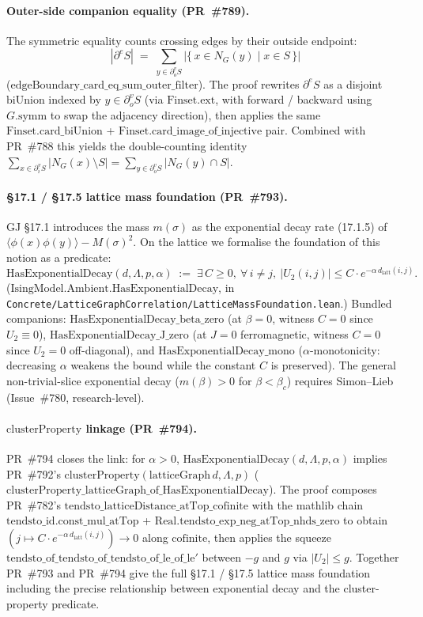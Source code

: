 \documentclass[a4paper,11pt]{article}
\begin{document}
\paragraph{Outer-side companion equality (PR~\#789).}
The symmetric equality counts crossing edges by their outside
endpoint:
\[
  |\partial^e S| \;=\;
    \sum_{y \in \partial^v_o S} \bigl|\{\,x \in N_G(y) \mid x \in S\,\}\bigr|
\]
($\mathrm{edgeBoundary\_card\_eq\_sum\_outer\_filter}$). The proof
rewrites $\partial^e S$ as a disjoint $\mathrm{biUnion}$ indexed by
$y \in \partial^v_o S$ (via $\mathrm{Finset.ext}$, with forward /
backward using $G.\mathrm{symm}$ to swap the adjacency direction),
then applies the same $\mathrm{Finset.card\_biUnion}$ +
$\mathrm{Finset.card\_image\_of\_injective}$ pair. Combined with
PR~\#788 this yields the double-counting identity
$\sum_{x \in \partial^v_i S} |N_G(x) \setminus S| =
\sum_{y \in \partial^v_o S} |N_G(y) \cap S|$.

\paragraph{\S17.1 / \S17.5 lattice mass foundation (PR~\#793).}
GJ \S17.1 introduces the mass $m(\sigma)$ as the exponential
decay rate (17.1.5) of $\langle\phi(x)\phi(y)\rangle - M(\sigma)^2$.
On the lattice we formalise the foundation of this notion as a
predicate:
\[
  \mathrm{HasExponentialDecay}(d, \Lambda, p, \alpha) \;:=\;
    \exists\, C \ge 0,\ \forall\, i \ne j,\
      |U_2(i, j)| \le C \cdot e^{-\alpha\, d_{\mathrm{latt}}(i, j)}.
\]
($\mathrm{IsingModel.Ambient.HasExponentialDecay}$, in
\texttt{Concrete/LatticeGraphCorrelation/LatticeMassFoundation.lean}.)
Bundled
companions: $\mathrm{HasExponentialDecay\_beta\_zero}$ (at
$\beta = 0$, witness $C = 0$ since $U_2 \equiv 0$),
$\mathrm{HasExponentialDecay\_J\_zero}$ (at $J = 0$ ferromagnetic,
witness $C = 0$ since $U_2 = 0$ off-diagonal), and
$\mathrm{HasExponentialDecay\_mono}$ ($\alpha$-monotonicity:
decreasing $\alpha$ weakens the bound while the constant $C$ is
preserved). The general non-trivial-slice exponential decay
($m(\beta) > 0$ for $\beta < \beta_c$) requires Simon--Lieb
(Issue~\#780, research-level).

\paragraph{$\mathrm{clusterProperty}$ linkage (PR~\#794).}
PR~\#794 closes the link: for $\alpha > 0$,
$\mathrm{HasExponentialDecay}(d, \Lambda, p, \alpha)$ implies
PR~\#792's $\mathrm{clusterProperty}(\mathrm{latticeGraph}\,d, \Lambda, p)$
($\mathrm{clusterProperty\_latticeGraph\_of\_HasExponentialDecay}$).
The proof composes PR~\#782's
$\mathrm{tendsto\_latticeDistance\_atTop\_cofinite}$ with the
mathlib chain
$\mathrm{tendsto\_id.const\_mul\_atTop}$ +
$\mathrm{Real.tendsto\_exp\_neg\_atTop\_nhds\_zero}$ to obtain
$(j \mapsto C \cdot e^{-\alpha\, d_{\mathrm{latt}}(i, j)}) \to 0$
along $\mathrm{cofinite}$, then applies the squeeze
$\mathrm{tendsto\_of\_tendsto\_of\_tendsto\_of\_le\_of\_le'}$
between $-g$ and $g$ via $|U_2| \le g$. Together PR~\#793 and
PR~\#794 give the full §17.1 / §17.5 lattice mass foundation
including the precise relationship between exponential decay and
the cluster-property predicate.
\end{document}
